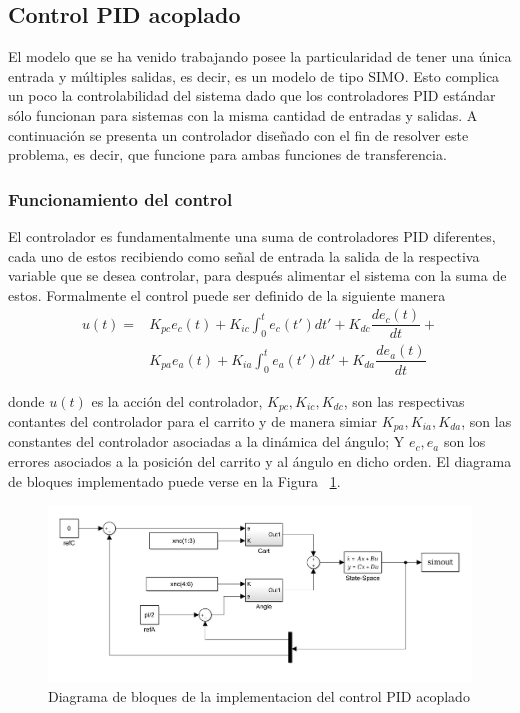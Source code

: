 \subsection{Control PID acoplado}
El modelo que se ha venido trabajando posee la particularidad de tener una única entrada
y múltiples salidas, es decir, es un modelo de tipo SIMO. Esto complica un poco la
controlabilidad del sistema dado que los controladores PID estándar sólo funcionan para sistemas con la misma cantidad de entradas y salidas.
A continuación se presenta un controlador diseñado con el fin de resolver este
problema, es decir, que funcione para ambas funciones de transferencia.\\

\subsubsection*{Funcionamiento del control}
El controlador es fundamentalmente una suma de controladores PID diferentes,
cada uno de estos recibiendo como señal de entrada la salida de la respectiva
variable que se desea controlar, para después alimentar el sistema con la suma de estos.
Formalmente el control puede ser definido de la siguiente manera
\begin{align*}
  u(t) =& K_{pc}e_c(t) + K_{ic}\int_0^te_c(t')dt' + K_{dc}\dfrac{de_{c}(t)}{dt} + \\
   & K_{pa}e_a(t) + K_{ia}\int_0^te_a(t')dt' + K_{da}\dfrac{de_{a}(t)}{dt}  
\end{align*}

donde $u(t)$ es la acción del controlador, $K_{pc}, K_{ic}, K_{dc}$, son las respectivas
contantes del controlador para el carrito y de manera simiar $K_{pa}, K_{ia}, K_{da}$,
son las constantes del controlador asociadas a la dinámica del ángulo; Y $e_c, e_a$ son los errores asociados a la posición del carrito y al ángulo en dicho orden.
El diagrama de bloques implementado puede verse en la Figura ~\ref{fig:controlS}.\\

\begin{figure}[t]
  \label{fig:controlS}
  \includegraphics[scale=0.2]{Figuras/control-modelo.jpg}
  \caption{Diagrama de bloques de la implementacion del control PID acoplado} 
\end{figure}

